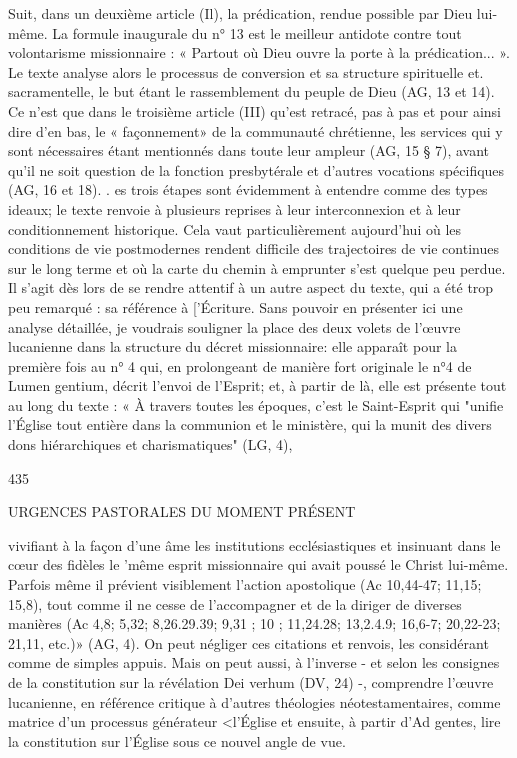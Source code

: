 Suit, dans un deuxième article (Il), la prédication, rendue possible par Dieu lui-même. La formule inaugurale du n° 13 est le meilleur antidote contre tout volontarisme missionnaire :
« Partout où Dieu ouvre la porte à la prédication... ». Le texte
analyse alors le processus de conversion et sa structure spirituelle et. sacramentelle, le but étant le rassemblement du peuple de Dieu (AG, 13 et 14). Ce n'est que dans le troisième article (III) qu'est retracé, pas à pas et pour ainsi dire d'en bas, le « façonnement» de la communauté chrétienne, les services qui y sont nécessaires étant mentionnés dans toute leur ampleur (AG, 15
§ 7), avant qu'il ne soit question de la fonction presbytérale et d'autres vocations spécifiques (AG, 16 et 18).
.  es trois étapes sont évidemment à entendre comme des types ideaux; le texte renvoie à plusieurs reprises à leur interconnexion et à leur conditionnement historique. Cela vaut particulièrement aujourd'hui où les conditions de vie postmodernes rendent difficile des trajectoires de vie continues sur le long terme et où la carte du chemin à emprunter s'est quelque peu perdue. Il s'agit dès lors de se rendre attentif à un autre aspect du texte, qui a été trop peu remarqué : sa référence à ['Écriture. Sans pouvoir en présenter ici une analyse détaillée, je voudrais souligner la place des deux volets de l'œuvre lucanienne dans la structure du décret missionnaire: elle apparaît pour la première fois au n° 4 qui, en prolongeant de manière fort originale le n°4 de Lumen gentium, décrit l'envoi de l'Esprit; et, à partir de là, elle est présente tout au long du texte :
« À travers toutes les époques, c'est le Saint-Esprit qui "unifie l'Église tout entière dans la communion et le ministère, qui la munit des divers dons hiérarchiques et charismatiques" (LG, 4),

435
 
URGENCES PASTORALES DU MOMENT PRÉSENT

vivifiant à la façon d'une âme les institutions ecclésiastiques et insinuant dans le cœur des fidèles le 'même esprit missionnaire qui avait poussé le Christ lui-même. Parfois même il prévient visiblement l'action apostolique (Ac 10,44-47; 11,15; 15,8), tout comme il ne cesse de l'accompagner et de la diriger de diverses manières (Ac 4,8; 5,32; 8,26.29.39; 9,31 ; 10 ; 11,24.28;
13,2.4.9; 16,6-7; 20,22-23; 21,11, etc.)» (AG, 4).
On peut négliger ces citations et renvois, les considérant comme de simples appuis. Mais on peut aussi, à l'inverse - et selon les consignes de la constitution sur la révélation Dei verhum (DV, 24) -, comprendre l'œuvre lucanienne, en référence critique à d'autres théologies néotestamentaires, comme matrice d'un processus générateur <l'Église et ensuite, à partir d'Ad gentes, lire la constitution sur l'Église sous ce nouvel angle
de vue.


